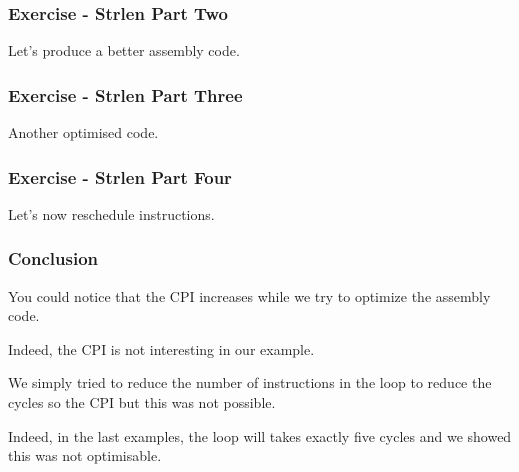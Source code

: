 
\begin{frame}
  \frametitle{Exercise - Strlen Part Two}

  Let's produce a better assembly code.

  \begin{center}
  \end{center}
\end{frame}


\begin{frame}
  \frametitle{Exercise - Strlen Part Three}

  Another optimised code.

  \begin{center}
  \end{center}
\end{frame}


\begin{frame}
  \frametitle{Exercise - Strlen Part Four}

  Let's now reschedule instructions.

  \begin{center}
  \end{center}
\end{frame}


\begin{frame}
  \frametitle{Conclusion}

  You could notice that the CPI increases while we try to
  optimize the assembly code.

  \nl

  Indeed, the CPI is not interesting in our example.

  \nl

  We simply tried to reduce the number of instructions in the loop
  to reduce the cycles so the CPI but this was not possible.

  \nl

  Indeed, in the last examples, the loop will takes exactly five cycles
  and we showed this was not optimisable.
\end{frame}


